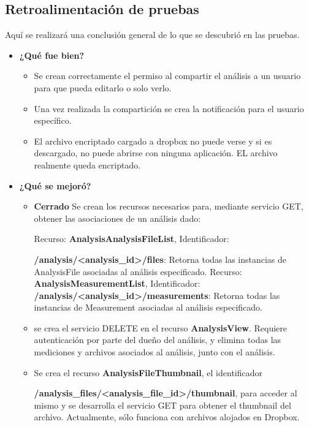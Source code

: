 \subsection{Retroalimentación de pruebas}
Aquí se realizará una conclusión general de lo que se descubrió en las pruebas.
	\begin{itemize}
		\item \textbf{¿Qué fue bien?}
        	\begin{itemize}
				\item Se crean correctamente el permiso al compartir el análisis a un usuario para que pueda editarlo o solo verlo.
				\item Una vez realizada la compartición se crea la notificación para el usuario específico.
				\item El archivo encriptado cargado a dropbox no puede verse y si es descargado, no puede abrirse con ninguna aplicación. EL archivo realmente queda encriptado.
			\end{itemize}

   		\item \textbf{¿Qué se mejoró?}
        	\begin{itemize}
                \item \textbf{Cerrado} Se crean los recursos necesarios para, mediante servicio GET, obtener las asociaciones de un análisis dado:
                
                    Recurso: \textbf{AnalysisAnalysisFileList}, Identificador: 
                    
                    \textbf{/analysis/<analysis\_id>/files}: Retorna todas las instancias de AnalysisFile asociadas al análisis especificado.
                    Recurso: \textbf{AnalysisMeasurementList}, Identificador: \textbf{/analysis/<analysis\_id>/measurements}: Retorna todas las instancias de Measurement asociadas al análisis especificado.
                
                \item se crea el servicio DELETE en el recurso \textbf{AnalysisView}. Requiere autenticación por parte del dueño del análisis, y elimina todas las mediciones y archivos asociados al análisis, junto con el análisis.
                
                \item Se crea el recurso \textbf{AnalysisFileThumbnail}, el identificador 
                
                \textbf{/analysis\_files/<analysis\_file\_id>/thumbnail}, para acceder al mismo y se desarrolla el servicio GET para obtener el thumbnail del archivo. Actualmente, sólo funciona con archivos alojados en Dropbox.
                

\end{itemize}
\end{itemize}
